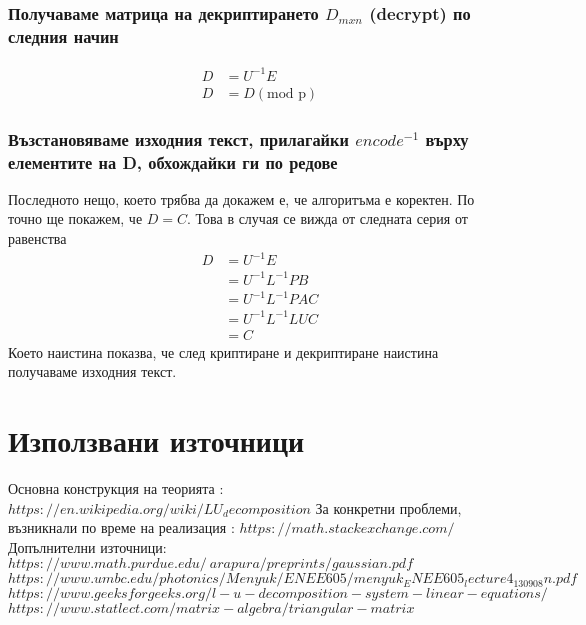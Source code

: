 \documentclass{article}
\begin{document}
\subsubsection{ Получаваме матрица на декриптирането $D_{mxn}$ (decrypt) по следния начин}
\begin{equation*}
\begin{split}
 D & = U^{-1}E\\ D & = D (\text{mod p})
\end{split}
\end{equation*}
\subsubsection{ Възстановяваме изходния текст, прилагайки $encode^{-1}$ върху елементите на D, обхождайки ги по редове}

Последното нещо, което трябва да докажем е, че алгоритъма е коректен. По точно ще покажем, че $D = C$. Това в случая се вижда от следната серия от равенства
\begin{equation*}
\begin{split}
 D & = U^{-1}E \\ & = U^{-1}L^{-1}PB \\ & = U^{-1}L^{-1}PAC \\ & = U^{-1}L^{-1}LUC \\ & = C
\end{split}
\end{equation*}
Което наистина показва, че след криптиране и декриптиране наистина получаваме изходния текст.

\section{Използвани източници}
Основна конструкция на теорията : \newline
	$https://en.wikipedia.org/wiki/LU_decomposition$ \newline
За конкретни проблеми, възникнали по време на реализация :\newline
	$https://math.stackexchange.com/$\newline
Допълнителни източници: \newline
	$https://www.math.purdue.edu/~arapura/preprints/gaussian.pdf$ \newline
	$https://www.umbc.edu/photonics/Menyuk/ENEE605/menyuk_ENEE605_lecture4_130908n.pdf$ \newline
	$https://www.geeksforgeeks.org/l-u-decomposition-system-linear-equations/$ \newline
	$https://www.statlect.com/matrix-algebra/triangular-matrix$
\end{document}
